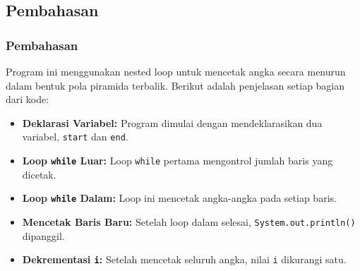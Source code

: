 \documentclass[aspectratio=169, table]{beamer}
\begin{document}
	\subsection{Pembahasan}
	\begin{frame}
		\frametitle{Pembahasan}
		Program ini menggunakan nested loop untuk mencetak angka secara menurun dalam bentuk pola piramida terbalik. Berikut adalah penjelasan setiap bagian dari kode:
		\begin{itemize}
			\item \textbf{Deklarasi Variabel:} Program dimulai dengan mendeklarasikan dua variabel, \texttt{start} dan \texttt{end}.
			\item \textbf{Loop \texttt{while} Luar:} Loop \texttt{while} pertama mengontrol jumlah baris yang dicetak.
			\item \textbf{Loop \texttt{while} Dalam:} Loop ini mencetak angka-angka pada setiap baris.
			\item \textbf{Mencetak Baris Baru:} Setelah loop dalam selesai, \texttt{System.out.println()} dipanggil.
			\item \textbf{Dekrementasi \texttt{i}:} Setelah mencetak seluruh angka, nilai \texttt{i} dikurangi satu.
		\end{itemize}
	\end{frame}


	
\end{document}
